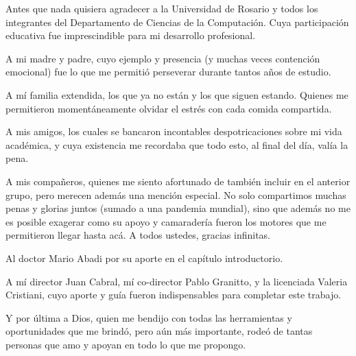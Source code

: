 Antes que nada quisiera agradecer a la Universidad de Rosario y todos los integrantes del Departamento de Ciencias de la Computación. Cuya participación educativa fue imprescindible para mi desarrollo profesional.

A mi madre y padre, cuyo ejemplo y presencia (y muchas veces contención emocional) fue lo que me permitió perseverar durante tantos años de estudio.

A mí familia extendida, los que ya no están y los que siguen estando. Quienes me permitieron momentáneamente olvidar el estrés con cada comida compartida.

A mis amigos, los cuales se bancaron incontables despotricaciones sobre mi vida académica, y cuya existencia me recordaba que todo esto, al final del día, valía la pena.

A mis compañeros, quienes me siento afortunado de  también incluir en el anterior grupo, pero merecen además una mención especial. No solo compartimos muchas penas y glorias juntos (sumado a una pandemia mundial), sino que además no me es posible exagerar como su apoyo y camaradería fueron los motores que me permitieron llegar hasta acá. A todos ustedes, gracias infinitas.

Al doctor Mario Abadi por su aporte en el capítulo introductorio.

A mí director Juan Cabral, mí co-director Pablo Granitto, y la licenciada Valeria Cristiani, cuyo aporte y guía fueron indispensables para completar este trabajo.

Y por última a Dios, quien me bendijo con todas las herramientas y oportunidades que me brindó, pero aún más importante, rodeó de tantas personas que amo y apoyan en todo lo que me propongo.